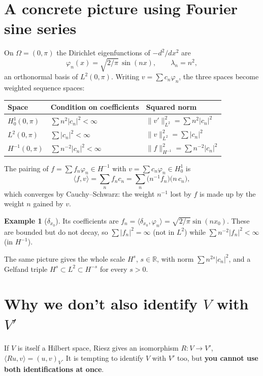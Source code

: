 \documentclass[11pt]{article}
\newcommand{\R}{\mathbb{R}}
\newcommand{\pair}[2]{\langle #1, #2 \rangle}
\newcommand{\ip}[2]{( #1, #2 )}
\theoremstyle{definition}
\newtheorem*{example}{Example}
\theoremstyle{plain}
\begin{document}
\section{A concrete picture using Fourier sine series}

On $\Omega=(0,\pi)$ the Dirichlet eigenfunctions of $-d^2/dx^2$ are
\[
  \varphi_n(x)=\sqrt{2/\pi}\,\sin(nx), \qquad \lambda_n=n^2,
\]
an orthonormal basis of $L^2(0,\pi)$. Writing $v=\sum c_n\varphi_n$, the three
spaces become weighted sequence spaces:
\begin{center}
\renewcommand{\arraystretch}{1.4}
\begin{tabular}{lll}
  \toprule
  Space & Condition on coefficients & Squared norm \\
  \midrule
  $H^1_0(0,\pi)$ & $\sum n^2|c_n|^2<\infty$ & $\|v'\|_{L^2}^2=\sum n^2|c_n|^2$ \\
  $L^2(0,\pi)$ & $\sum |c_n|^2<\infty$ & $\|v\|_{L^2}^2=\sum |c_n|^2$ \\
  $H^{-1}(0,\pi)$ & $\sum n^{-2}|c_n|^2<\infty$ & $\|f\|_{H^{-1}}^2=\sum n^{-2}|c_n|^2$ \\
  \bottomrule
\end{tabular}
\end{center}
The pairing of $f=\sum f_n\varphi_n\in H^{-1}$ with $v=\sum c_n\varphi_n\in H^1_0$
is
\[
  \pair{f}{v}=\sum_n f_n c_n
  = \sum_n \bigl(n^{-1}f_n\bigr)\bigl(n\,c_n\bigr),
\]
which converges by Cauchy--Schwarz: the weight $n^{-1}$ lost by $f$ is made up
by the weight $n$ gained by $v$.

\begin{example}[$\delta_{x_0}$]
Its coefficients are $f_n=\pair{\delta_{x_0}}{\varphi_n}=\sqrt{2/\pi}\sin(nx_0)$.
These are bounded but do not decay, so $\sum|f_n|^2=\infty$ (not in $L^2$) while
$\sum n^{-2}|f_n|^2<\infty$ (in $H^{-1}$).
\end{example}

The same picture gives the whole scale $H^s$, $s\in\R$, with norm
$\sum n^{2s}|c_n|^2$, and a Gelfand triple $H^s\subset L^2\subset H^{-s}$ for
every $s>0$.

\section{Why we don't also identify $V$ with $V'$}

If $V$ is itself a Hilbert space, Riesz gives an isomorphism
$R:V\to V'$, $\pair{Ru}{v}=\ip{u}{v}_V$. It is tempting to identify $V$ with
$V'$ too, but \textbf{you cannot use both identifications at once}.
\end{document}
